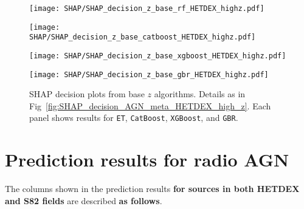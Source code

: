 \documentclass{aa}
\begin{document}
\begin{appendix}
\begin{figure}
  \centering
  \begin{minipage}{0.48\columnwidth}
    \centering
    \texttt{[image: SHAP/SHAP\_decision\_z\_base\_rf\_HETDEX\_highz.pdf]}
  \end{minipage}%
  \hfill
  \begin{minipage}{0.48\columnwidth}
    \centering
    \texttt{[image: SHAP/SHAP\_decision\_z\_base\_catboost\_HETDEX\_highz.pdf]}
  \end{minipage}\break%
  \begin{minipage}{0.48\columnwidth}
    \centering
    \texttt{[image: SHAP/SHAP\_decision\_z\_base\_xgboost\_HETDEX\_highz.pdf]}
  \end{minipage}%
  \hfill
  \begin{minipage}{0.48\columnwidth}
    \centering
    \texttt{[image: SHAP/SHAP\_decision\_z\_base\_gbr\_HETDEX\_highz.pdf]}
  \end{minipage}
  \caption{SHAP decision plots from base $z$ algorithms. Details as in Fig~\ref{fig:SHAP_decision_AGN_meta_HETDEX_high_z}. Each panel shows results for \texttt{ET}, \texttt{CatBoost}, \texttt{XGBoost}, and \texttt{GBR}.}
  \label{fig:SHAP_decision_z_base_HETDEX_high_z}
\end{figure}

\section{Prediction results for radio AGN}\label{sec:app_prediction_results}

The columns shown in the prediction results \textbf{for sources in both HETDEX and S82 fields} are described \textbf{as follows}.

\begin{itemize}


\end{itemize}
\end{appendix}
\end{document}
